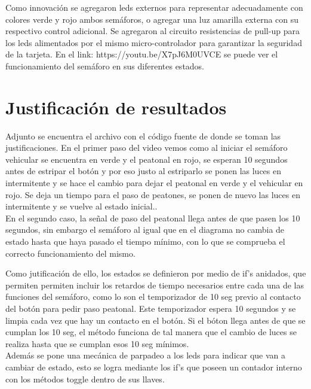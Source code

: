 \documentclass[letterpaper]{article}
\begin{document}
Como innovación se agregaron leds externos para representar adecuadamente con colores verde y rojo ambos semáforos, o agregar una luz amarilla externa con su respectivo control adicional. Se agregaron al circuito resistencias de pull-up para los leds alimentados por el mismo micro-controlador para garantizar la seguridad de la tarjeta. En el link: https://youtu.be/X7pJ6M0UVCE se puede ver el funcionamiento del semáforo en sus diferentes estados.

\section{Justificación de resultados}
Adjunto se encuentra el archivo con el código fuente de donde se toman las justificaciones. En el primer paso del video vemos como al iniciar el semáforo vehicular se encuentra en verde y el peatonal en rojo, se esperan 10 segundos antes de estripar el botón y por eso justo al estriparlo se ponen las luces en intermitente y se hace el cambio para dejar el peatonal en verde y el vehicular en rojo. Se deja un tiempo para el paso de peatones, se ponen de nuevo las luces en intermitente y se vuelve al estado inicial..\\[0.5cm]
En el segundo caso, la señal de paso del peatonal llega antes de que pasen los 10 segundos, sin embargo el semáforo al igual que en el diagrama no cambia de estado hasta que haya pasado el tiempo mínimo, con lo que se comprueba el correcto funcionamiento del mismo.\\[0.5cm]
 
\newpage

Como jutificación de ello,  los estados se definieron por medio de if's anidados, que permiten permiten incluir los retardos de tiempo necesarios entre cada una de las funciones del semáforo, como lo son el temporizador de 10 seg previo al contacto del botón para pedir paso peatonal. Este temporizador espera 10 segundos y se limpia cada vez que hay un contacto en el botón. Si el bóton llega antes de que se cumplan los 10 seg, el método funciona de tal manera que el cambio de luces se realiza hasta que se cumplan esos 10 seg mínimos.\\[0.5cm]
Además se pone una mecánica de parpadeo a los leds para indicar que van a cambiar de estado, esto se logra mediante los if's que poseen un contador interno con los métodos toggle dentro de sus llaves.\\[0.5cm]
\end{document}

